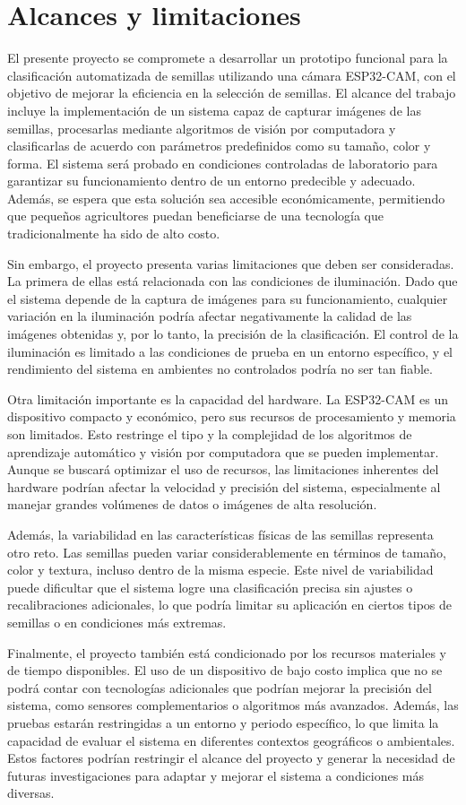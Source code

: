 \section{Alcances y limitaciones}

El presente proyecto se compromete a desarrollar un prototipo funcional para la clasificación automatizada de semillas utilizando una cámara ESP32-CAM, con el objetivo de mejorar la eficiencia en la selección de semillas. El alcance del trabajo incluye la implementación de un sistema capaz de capturar imágenes de las semillas, procesarlas mediante algoritmos de visión por computadora y clasificarlas de acuerdo con parámetros predefinidos como su tamaño, color y forma. El sistema será probado en condiciones controladas de laboratorio para garantizar su funcionamiento dentro de un entorno predecible y adecuado. Además, se espera que esta solución sea accesible económicamente, permitiendo que pequeños agricultores puedan beneficiarse de una tecnología que tradicionalmente ha sido de alto costo.

Sin embargo, el proyecto presenta varias limitaciones que deben ser consideradas. La primera de ellas está relacionada con las condiciones de iluminación. Dado que el sistema depende de la captura de imágenes para su funcionamiento, cualquier variación en la iluminación podría afectar negativamente la calidad de las imágenes obtenidas y, por lo tanto, la precisión de la clasificación. El control de la iluminación es limitado a las condiciones de prueba en un entorno específico, y el rendimiento del sistema en ambientes no controlados podría no ser tan fiable.

Otra limitación importante es la capacidad del hardware. La ESP32-CAM es un dispositivo compacto y económico, pero sus recursos de procesamiento y memoria son limitados. Esto restringe el tipo y la complejidad de los algoritmos de aprendizaje automático y visión por computadora que se pueden implementar. Aunque se buscará optimizar el uso de recursos, las limitaciones inherentes del hardware podrían afectar la velocidad y precisión del sistema, especialmente al manejar grandes volúmenes de datos o imágenes de alta resolución.

Además, la variabilidad en las características físicas de las semillas representa otro reto. Las semillas pueden variar considerablemente en términos de tamaño, color y textura, incluso dentro de la misma especie. Este nivel de variabilidad puede dificultar que el sistema logre una clasificación precisa sin ajustes o recalibraciones adicionales, lo que podría limitar su aplicación en ciertos tipos de semillas o en condiciones más extremas.

Finalmente, el proyecto también está condicionado por los recursos materiales y de tiempo disponibles. El uso de un dispositivo de bajo costo implica que no se podrá contar con tecnologías adicionales que podrían mejorar la precisión del sistema, como sensores complementarios o algoritmos más avanzados. Además, las pruebas estarán restringidas a un entorno y periodo específico, lo que limita la capacidad de evaluar el sistema en diferentes contextos geográficos o ambientales. Estos factores podrían restringir el alcance del proyecto y generar la necesidad de futuras investigaciones para adaptar y mejorar el sistema a condiciones más diversas.